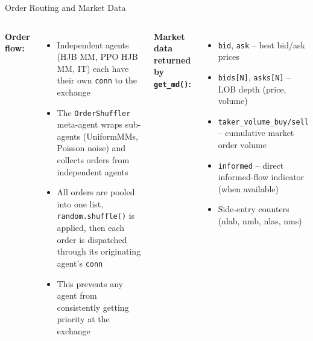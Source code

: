 \documentclass[10pt,aspectratio=169]{beamer}
\begin{document}
\begin{frame}{Order Routing and Market Data}
  \begin{columns}[T]
    \textbf{Order flow:}
    \begin{itemize}
      \item Independent agents (HJB MM, PPO HJB MM, IT) each have their own \texttt{conn} to the exchange
      \item The \texttt{OrderShuffler} meta-agent wraps sub-agents (UniformMMs, Poisson noise) and collects orders from independent agents
      \item All orders are pooled into one list, \texttt{random.shuffle()} is applied, then each order is dispatched through its originating agent's \texttt{conn}
      \item This prevents any agent from consistently getting priority at the exchange
    \end{itemize}

    \textbf{Market data returned by \texttt{get\_md()}:}
    \begin{itemize}
      \item \texttt{bid}, \texttt{ask} -- best bid/ask prices
      \item \texttt{bids[N]}, \texttt{asks[N]} -- LOB depth (price, volume)
      \item \texttt{taker\_volume\_buy/sell} -- cumulative market order volume
      \item \texttt{informed} -- direct informed-flow indicator (when available)
      \item Side-entry counters (nlab, nmb, nlas, nms)
    \end{itemize}
  \end{columns}
\end{frame}
\end{document}
